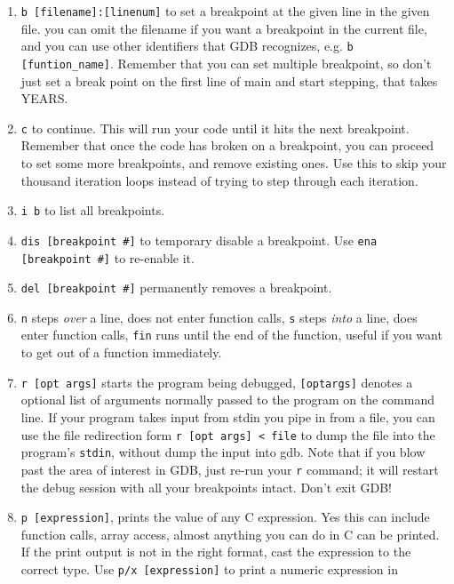 \documentclass[11pt]{article}
\begin{document}
\begin{enumerate}
    \item \texttt{b [filename]:[linenum]} to set a breakpoint at the given line in the
        given file. you can omit the filename if you want a breakpoint in the current
        file, and you can use other identifiers that GDB recognizes, e.g. \texttt{b
        [funtion\_name]}. Remember that you can set multiple breakpoint, so don't just set
        a break point on the first line of main and start stepping, that takes YEARS.
    \item \texttt{c} to continue. This will run your code until it hits the next
        breakpoint. Remember that once the code has broken on a breakpoint, you can
        proceed to set some more breakpoints, and remove existing ones. Use this to skip
        your thousand iteration loops instead of trying to step through each iteration.
    \item \texttt{i b} to list all breakpoints.
    \item \texttt{dis [breakpoint \#]} to temporary disable a breakpoint. Use \texttt{ena
        [breakpoint \#]} to re-enable it.
    \item \texttt{del [breakpoint \#]} permanently removes a breakpoint.
    \item \texttt{n} steps \emph{over} a line, does not enter function calls, \texttt{s}
        steps \emph{into} a line, does enter function calls, \texttt{fin} runs until the
        end of the function, useful if you want to get out of a function immediately.
    \item \texttt{r [opt args]} starts the program being debugged, \texttt{[optargs]}
        denotes a optional list of arguments normally passed to the program on the command
        line. If your program takes input from stdin you pipe in from a file, you can use
        the file redirection form \texttt{r [opt args] < file} to dump the file into
        the program's \texttt{stdin}, without dump the input into gdb. Note that if you blow past
        the area of interest in GDB, just re-run your \texttt{r} command; it will restart
        the debug session with all your breakpoints intact. Don't exit GDB!
    \item \texttt{p [expression]}, prints the value of any C expression. Yes this can
        include function calls, array access, almost anything you can do in C can be
        printed. If the print output is not in the right format, cast the expression to
        the correct type. Use \texttt{p/x [expression]} to print a numeric expression in

\end{enumerate}
\end{document}

